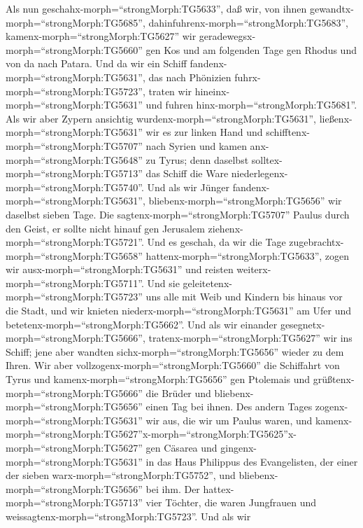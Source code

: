  Als nun geschahx-morph=``strongMorph:TG5633'', daß wir, von
ihnen gewandtx-morph=``strongMorph:TG5685'',
dahinfuhrenx-morph=``strongMorph:TG5683'',
kamenx-morph=``strongMorph:TG5627'' wir
geradewegsx-morph=``strongMorph:TG5660'' gen Kos und am folgenden Tage
gen Rhodus und von da nach Patara.  Und da wir ein Schiff
fandenx-morph=``strongMorph:TG5631'', das nach Phönizien
fuhrx-morph=``strongMorph:TG5723'', traten wir
hineinx-morph=``strongMorph:TG5631'' und fuhren
hinx-morph=``strongMorph:TG5681''.  Als wir aber Zypern
ansichtig wurdenx-morph=``strongMorph:TG5631'',
ließenx-morph=``strongMorph:TG5631'' wir es zur linken Hand und
schifftenx-morph=``strongMorph:TG5707'' nach Syrien und kamen
anx-morph=``strongMorph:TG5648'' zu Tyrus; denn daselbst
solltex-morph=``strongMorph:TG5713'' das Schiff die Ware
niederlegenx-morph=``strongMorph:TG5740''.  Und als wir
Jünger fandenx-morph=``strongMorph:TG5631'',
bliebenx-morph=``strongMorph:TG5656'' wir daselbst sieben Tage. Die
sagtenx-morph=``strongMorph:TG5707'' Paulus durch den Geist, er sollte
nicht hinauf gen Jerusalem ziehenx-morph=``strongMorph:TG5721''.
 Und es geschah, da wir die Tage
zugebrachtx-morph=``strongMorph:TG5658''
hattenx-morph=``strongMorph:TG5633'', zogen wir
ausx-morph=``strongMorph:TG5631'' und reisten
weiterx-morph=``strongMorph:TG5711''. Und sie
geleitetenx-morph=``strongMorph:TG5723'' uns alle mit Weib und Kindern
bis hinaus vor die Stadt, und wir knieten
niederx-morph=``strongMorph:TG5631'' am Ufer und
betetenx-morph=``strongMorph:TG5662''.  Und als wir einander
gesegnetx-morph=``strongMorph:TG5666'',
tratenx-morph=``strongMorph:TG5627'' wir ins Schiff; jene aber wandten
sichx-morph=``strongMorph:TG5656'' wieder zu dem Ihren.  Wir
aber vollzogenx-morph=``strongMorph:TG5660'' die Schiffahrt von Tyrus
und kamenx-morph=``strongMorph:TG5656'' gen Ptolemais und
grüßtenx-morph=``strongMorph:TG5666'' die Brüder und
bliebenx-morph=``strongMorph:TG5656'' einen Tag bei ihnen. 
Des andern Tages zogenx-morph=``strongMorph:TG5631'' wir aus, die wir um
Paulus waren, und
kamenx-morph=``strongMorph:TG5627''\textbar x-morph=``strongMorph:TG5625''x-morph=``strongMorph:TG5627''
gen Cäsarea und gingenx-morph=``strongMorph:TG5631'' in das Haus
Philippus des Evangelisten, der einer der sieben
warx-morph=``strongMorph:TG5752'', und
bliebenx-morph=``strongMorph:TG5656'' bei ihm.  Der
hattex-morph=``strongMorph:TG5713'' vier Töchter, die waren Jungfrauen
und weissagtenx-morph=``strongMorph:TG5723''.  Und als wir
